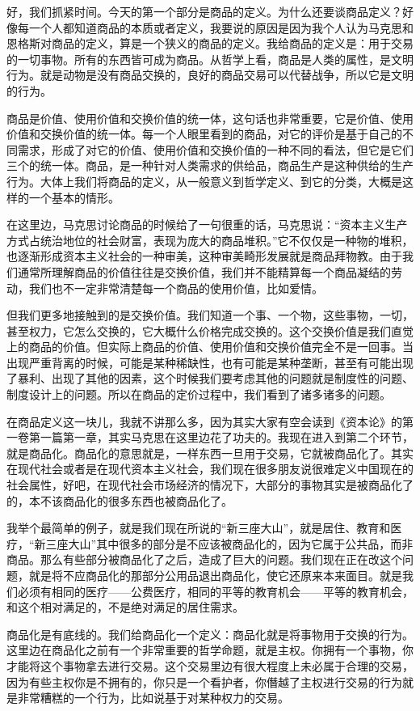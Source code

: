 \documentclass[UTF8, 12pt, a4paper]{ctexrep}
\begin{document}
好，我们抓紧时间。今天的第一个部分是商品的定义。为什么还要谈商品定义？好像每一个人都知道商品的本质或者定义，我要说的原因是因为我个人认为马克思和恩格斯对商品的定义，算是一个狭义的商品的定义。我给商品的定义是：用于交易的一切事物。所有的东西皆可成为商品。从哲学上看，商品是人类的属性，是文明行为。就是动物是没有商品交换的，良好的商品交易可以代替战争，所以它是文明的行为。

商品是价值、使用价值和交换价值的统一体，这句话也非常重要，它是价值、使用价值和交换价值的统一体。每一个人眼里看到的商品，对它的评价是基于自己的不同需求，形成了对它的价值、使用价值和交换价值的一种不同的看法，但它是它们三个的统一体。商品，是一种针对人类需求的供给品，商品生产是这种供给的生产行为。大体上我们将商品的定义，从一般意义到哲学定义、到它的分类，大概是这样的一个基本的情形。

在这里边，马克思讨论商品的时候给了一句很重的话，马克思说：“资本主义生产方式占统治地位的社会财富，表现为庞大的商品堆积。”它不仅仅是一种物的堆积，也逐渐形成资本主义社会的一种审美，这种审美畸形发展就是商品拜物教。由于我们通常所理解商品的价值往往是交换价值，我们并不能精算每一个商品凝结的劳动，我们也不一定非常清楚每一个商品的使用价值，比如爱情。

但我们更多地接触到的是交换价值。我们知道一个事、一个物，这些事物，一切，甚至权力，它怎么交换的，它大概什么价格完成交换的。这个交换价值是我们直觉上的商品的价值。但实际上商品的价值、使用价值和交换价值完全不是一回事。当出现严重背离的时候，可能是某种稀缺性，也有可能是某种垄断，甚至有可能出现了暴利、出现了其他的因素，这个时候我们要考虑其他的问题就是制度性的问题、制度设计上的问题。所以在商品的定价过程中，我们看到了诸多诸多的问题。

在商品定义这一块儿，我就不讲那么多，因为其实大家有空会读到《资本论》的第一卷第一篇第一章，其实马克思在这里边花了功夫的。我现在进入到第二个环节，就是商品化。商品化的意思就是，一样东西一旦用于交易，它就被商品化了。其实在现代社会或者是在现代资本主义社会，我们现在很多朋友说很难定义中国现在的社会属性，好吧，在现代社会市场经济的情况下，大部分的事物其实是被商品化了的，本不该商品化的很多东西也被商品化了。

我举个最简单的例子，就是我们现在所说的“新三座大山”，就是居住、教育和医疗，“新三座大山”其中很多的部分是不应该被商品化的，因为它属于公共品，而非商品。那么有些部分被商品化了之后，造成了巨大的问题。我们现在正在改这个问题，就是将不应商品化的那部分公用品退出商品化，使它还原来本来面目。就是我们必须有相同的医疗——公费医疗，相同的平等的教育机会——平等的教育机会，和这个相对满足的，不是绝对满足的居住需求。

商品化是有底线的。我们给商品化一个定义：商品化就是将事物用于交换的行为。这里边在商品化之前有一个非常重要的哲学命题，就是主权。你拥有一个事物，你才能将这个事物拿去进行交易。这个交易里边有很大程度上未必属于合理的交易，因为有些主权你是不拥有的，你只是一个看护者，你僭越了主权进行交易的行为就是非常糟糕的一个行为，比如说基于对某种权力的交易。
\end{document}
